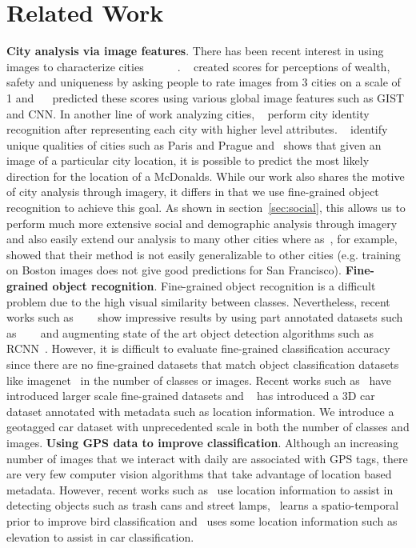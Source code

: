 \documentclass[10pt,twocolumn,letterpaper]{article}
\begin{document}
\section{Related Work}
\textbf{City analysis via image features}. There has been recent interest in using images to characterize cities~\cite{mit_plos_1}~\cite{tamara}~\cite{paris}~\cite{antonio}~\cite{mit_cvpr}~\cite{mcdonalds}. ~\cite{mit_plos_1} created scores for perceptions of wealth, safety and uniqueness by asking people to rate images from 3 cities on a scale of 1 and ~\cite{mit_cvpr}~\cite{tamara} predicted these scores using various global image features such as GIST and CNN. In another line of work analyzing cities, ~\cite{antonio} perform city identity recognition after representing each city with higher level attributes. ~\cite{paris} identify unique qualities of cities such as Paris and Prague and~\cite{mcdonalds} shows that given an image of a particular city location, it is possible to predict the most likely direction for the location of a McDonalds. While our work also shares the motive of city analysis through imagery, it differs in that we use fine-grained object recognition to achieve this goal. As shown in section~\ref{sec:social}, this allows us to perform much more extensive social and demographic analysis through imagery and also easily extend our analysis to many other cities where as~\cite{tamara}, for example, showed that their method is not easily generalizable to other cities (e.g. training on Boston images does not give good predictions for San Francisco).\newline\newline
\textbf{Fine-grained object recognition}. Fine-grained object recognition is a difficult problem due to the high visual similarity between classes. Nevertheless, recent works such as ~\cite{ning}~\cite{steve}~\cite{jon} show impressive results by using part annotated datasets such as ~\cite{birds}~\cite{dogs}~\cite{cars} and augmenting state of the art object detection algorithms such as RCNN~\cite{rcnn}. However, it is difficult to evaluate fine-grained classification accuracy since there are no fine-grained datasets that match object classification datasets like imagenet~\cite{imagenet} in the number of classes or images. Recent works such as~\cite{birdsnap} have introduced larger scale fine-grained datasets and ~\cite{nyc3d} has introduced a 3D car dataset annotated with metadata such as location information. We introduce a geotagged car dataset with unprecedented scale in both the number of classes and images.\newline\newline
\textbf{Using GPS data to improve classification}. Although an increasing number of images that we interact with daily are associated with GPS tags, there are very few computer vision algorithms that take advantage of location based metadata. However, recent works such as~\cite{amir} use location information to assist in detecting objects such as trash cans and street lamps,~\cite{birdsnap} learns a spatio-temporal prior to improve bird classification and~\cite{nyc3d} uses some location information such as elevation to assist in car classification. 
\end{document}
